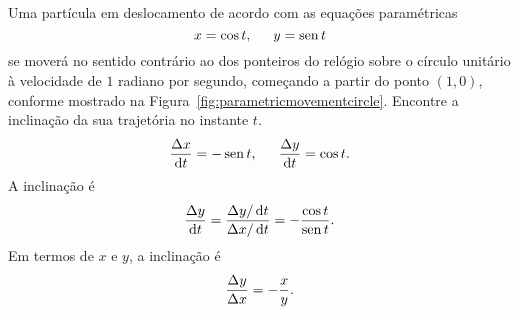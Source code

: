 
\begin{example}
Uma partícula em deslocamento de acordo com as equações paramétricas
$$
  x = \cos t, \hspace{1.5em} y = \operatorname{sen} t
$$
se moverá no sentido contrário ao dos ponteiros do relógio sobre
o círculo unitário à velocidade de $1$ radiano por segundo, começando
a partir do ponto $(1, 0)$, conforme mostrado na
Figura~\ref{fig:parametricmovementcircle}. Encontre a inclinação
da sua trajetória no instante $t$.
$$
  \frac{\dx}{\dt} = -\sen t, \hspace{1.5em}
  \frac{\dy}{\dt} = \cos t.
$$
A inclinação é
$$
  \frac{\dy}{\dt} = \frac{\dy/\dt}{\dx/\dt} = - \frac{\cos t}{\sen t}.
$$
Em termos de $x$ e $y$, a inclinação é
$$
  \frac{\Delta{y}}{\Delta{x}} = -\frac{x}{y}.
$$
\end{example}


